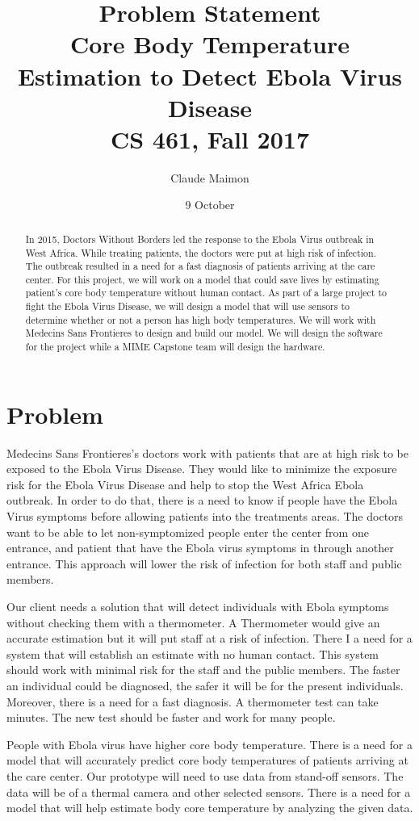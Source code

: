 \documentclass{article}
\title{%
  Problem Statement \\
  \large Core Body Temperature Estimation to Detect Ebola Virus Disease \\
  \large CS 461, Fall 2017\\
    }
\author{Claude Maimon }
\date{9 October}
\begin{document}
\maketitle


\begin{abstract}
In 2015, Doctors Without Borders led the response to the Ebola Virus outbreak in West Africa. While treating patients, the doctors were put at high risk of infection. The outbreak resulted in a need for a fast diagnosis of patients arriving at the care center. For this project, we will work on a model that could save lives by estimating patient’s core body temperature without human contact. As part of a large project to fight the Ebola Virus Disease, we will design a model that will use sensors to determine whether or not a person has high body temperatures. We will work with Medecins Sans Frontieres to design and build our model. We will design the software for the project while a MIME Capstone team will design the hardware.   \end{abstract}
\newpage
\section{Problem}
Medecins Sans Frontieres’s doctors work with patients that are at high risk to be exposed to the Ebola Virus Disease. They would like to minimize the exposure risk for the Ebola Virus Disease and help to stop the West Africa Ebola outbreak. In order to do that, there is a need to know if people have the Ebola Virus symptoms before allowing patients into the treatments areas. The doctors want to be able to let non-symptomized people enter the center from one entrance, and patient that have the Ebola virus symptoms in through another entrance. This approach will lower the risk of infection for both staff and public members.\par 
Our client needs a solution that will detect individuals with Ebola symptoms without checking them with a thermometer. A Thermometer would give an accurate estimation but it will put staff at a risk of infection. There I a need for a system that will establish an estimate with no human contact. This system should work with minimal risk for the staff and the public members. The faster an individual could be diagnosed, the safer it will be for the present individuals. Moreover, there is a need for a fast diagnosis. A thermometer test can take minutes. The new test should be faster and work for many people.  \par
People with Ebola virus have higher core body temperature. There is a need for a model that will accurately predict core body temperatures of patients arriving at the care center. Our prototype will need to use data from stand-off sensors. The data will be of a thermal camera and other selected sensors. There is a need for a model that will help estimate body core temperature by analyzing the given data.   
\end{document}
